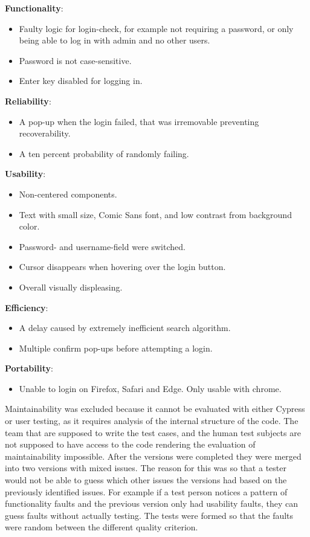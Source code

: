 \documentclass[journal,twocolumn]{IEEEtran}
\begin{document}
\textbf{Functionality}:
\begin{itemize}
    \item Faulty logic for login-check, for example not requiring a password, or only being able to log in with admin and no other users.
    \item Password is not case-sensitive.
    \item Enter key disabled for logging in.
\end{itemize}

\textbf{Reliability}:
\begin{itemize}
    \item A pop-up when the login failed, that was irremovable preventing recoverability.
    \item A ten percent probability of randomly failing.
\end{itemize}

\textbf{Usability}:
\begin{itemize}
    \item Non-centered components.
    \item Text with small size, Comic Sans font, and low contrast from background color.
    \item Password- and username-field were switched.
    \item Cursor disappears when hovering over the login button.
    \item Overall visually displeasing.
\end{itemize}

\textbf{Efficiency}:
\begin{itemize}
    \item A delay caused by extremely inefficient search algorithm.
    \item Multiple confirm pop-ups before attempting a login.
\end{itemize}

\textbf{Portability}:
\begin{itemize}
    \item Unable to login on Firefox, Safari and Edge. Only usable with chrome.
\end{itemize}

Maintainability was excluded because it cannot be evaluated with either Cypress or user testing, as it requires analysis of the internal structure of the code. The team that are supposed to write the test cases, and the human test subjects are not supposed to have access to the code rendering the evaluation of maintainability impossible. After the versions were completed they were merged into two versions with mixed issues. The reason for this was so that a tester would not be able to guess which other issues the versions had based on the previously identified issues. For example if a test person notices a pattern of functionality faults and the previous version only had usability faults, they can guess faults without actually testing. The tests were formed so that the faults were random between the different quality criterion.
\end{document}

